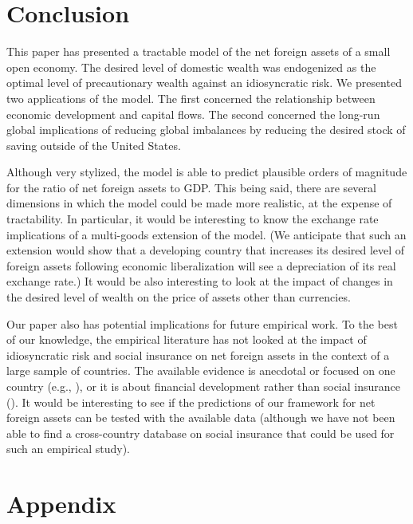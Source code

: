 \documentclass[titlepage]{\econtex}\newcommand{\texname}{cjSOE}
\begin{document}
\section{Conclusion}

This paper has presented a tractable model of the net foreign assets
of a small open economy. The desired level of domestic wealth was
endogenized as the optimal level of precautionary wealth against an
idiosyncratic risk. We presented two applications of the model. The
first concerned the relationship between economic development and
capital flows.  The second concerned the long-run global implications
of reducing global imbalances by reducing the desired stock of saving
outside of the United States.

Although very stylized, the model is able to predict plausible orders
of magnitude for the ratio of net foreign assets to GDP. This being
said, there are several dimensions in which the model could be made
more realistic, at the expense of tractability. In
particular, it would be interesting to know the exchange rate
implications of a multi-goods extension of the model. (We anticipate
that such an extension would show that a developing country that
increases its desired level of foreign assets following economic
liberalization will see a depreciation of its real exchange rate.)  It
would be also interesting to look at the impact of changes in the
desired level of wealth on the price of assets other than currencies.

Our paper also has potential implications for future empirical
work. To the best of our knowledge, the empirical literature has not
looked at the impact of idiosyncratic risk and social insurance on net
foreign assets in the context of a large sample of countries. The available
evidence is anecdotal or focused on one country (e.g.,
\cite{cpChina}), or it is about financial development rather than
social insurance (\cite{mqrImbal}). It would be interesting to see if
the predictions of our framework for net foreign assets can be tested
with the available data (although we have not been able to find a cross-country
database on social insurance that could be used for such an empirical study).


\pagebreak\appendix
\setcounter{section}{0}
\setcounter{subsection}{0}

\section{Appendix}
\end{document}
